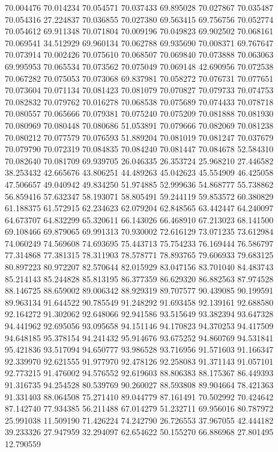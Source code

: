 70.004476
70.014234
70.054571
70.037433
69.895028
70.027867
70.035487
70.054316
27.224837
70.036855
70.027380
69.563415
69.756756
70.052774
70.054612
69.911348
70.071804
70.009196
70.049823
69.902502
70.068161
70.069541
34.512929
69.960134
70.062788
69.935690
70.008371
69.767647
70.073914
70.002426
70.075610
70.068507
70.069840
70.073888
70.063063
69.995953
70.065534
70.073562
70.075049
70.069148
42.690956
70.072538
70.067282
70.075053
70.073068
69.837981
70.058272
70.076731
70.077651
70.073604
70.071134
70.081423
70.081079
70.070827
70.079733
70.074753
70.082832
70.079762
70.016278
70.068538
70.075689
70.074433
70.078718
70.080557
70.065666
70.079381
70.075240
70.075209
70.081888
70.081930
70.080969
70.080448
70.080686
51.053891
70.079666
70.082069
70.081238
70.080212
70.077579
70.076593
51.889204
70.081019
70.081247
70.037679
70.079790
70.072319
70.084835
70.084240
70.081447
70.084678
52.584310
70.082640
70.081709
69.939705
26.046335
26.353724
25.968210
27.446582
38.253432
42.665676
43.806251
44.489263
45.042623
45.554909
46.425058
47.506657
49.040942
49.834250
51.974885
52.999636
54.868777
55.738862
56.859416
57.632347
58.193071
58.805491
59.244119
59.853572
60.380829
61.188375
61.572915
62.234623
62.079204
62.848565
63.442447
64.240097
64.673707
64.832299
65.320611
66.143026
66.468910
67.213023
68.141500
69.108466
69.879065
69.991313
70.930002
72.616129
73.071235
73.612984
74.060249
74.569608
74.693695
75.443713
75.754233
76.169444
76.586797
77.314868
77.381315
78.311903
78.578771
78.893765
79.606933
79.683125
80.897223
80.972207
82.570644
82.015929
83.047156
83.701040
84.483743
85.214143
85.244828
85.813195
86.377359
86.629320
86.882563
87.974528
88.146725
88.659002
89.006342
88.929319
89.707577
90.439085
90.199591
89.963134
91.644522
90.785549
91.248292
91.693458
92.139161
92.688580
92.164272
91.302062
92.648066
92.941586
93.515649
93.382394
93.647328
94.441962
92.695056
93.095658
94.151146
94.170823
94.370253
94.417509
94.648185
95.378154
94.241432
95.914676
93.675252
94.860769
94.531841
95.421836
93.517094
94.650777
93.986528
93.716956
91.571603
91.166347
92.339970
92.621555
91.977970
92.478126
92.258083
91.371143
91.057101
92.773215
91.476002
94.576552
92.619603
88.806383
88.175367
86.449393
91.316735
94.254528
80.539769
90.260027
88.593808
89.904664
78.421363
91.331403
88.064508
75.271410
89.044779
87.161491
70.502992
70.424642
87.142740
77.934385
56.211488
67.014279
51.232711
69.956016
80.787972
25.991038
11.509190
71.426224
74.242790
26.726553
37.967055
42.444182
39.233326
27.947959
32.294097
62.654622
50.155270
66.886968
27.801495
12.790559
